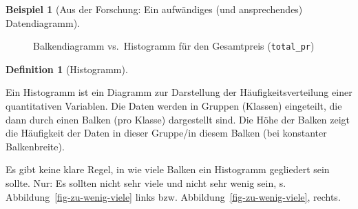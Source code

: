 \documentclass[
  a4paper,
]{scrbook}
\theoremstyle{definition}
\newtheorem{example}{Beispiel}[chapter]
\theoremstyle{definition}
\newtheorem{definition}{Definition}[chapter]
\theoremstyle{definition}
\theoremstyle{remark}
\begin{document}
\begin{example}[Aus der Forschung: Ein aufwändiges (und ansprechendes)
Datendiagramm]
\begin{figure}
\begin{minipage}{0.50\linewidth}
{}


\end{minipage}%

\caption{\label{fig-balken-hist}Balkendiagramm vs.~Histogramm für den
Gesamtpreis (\texttt{total\_pr})}

\end{figure}%

\begin{definition}[Histogramm]\protect\hypertarget{def-histogramm}{}\label{def-histogramm}

Ein Histogramm ist ein Diagramm zur Darstellung der
Häufigkeitsverteilung einer quantitativen Variablen. Die Daten werden in
Gruppen (Klassen) eingeteilt, die dann durch einen Balken (pro Klasse)
dargestellt sind. Die Höhe der Balken zeigt die Häufigkeit der Daten in
dieser Gruppe/in diesem Balken (bei konstanter Balkenbreite).

\end{definition}

Es gibt keine klare Regel, in wie viele Balken ein Histogramm gegliedert
sein sollte. Nur: Es sollten nicht sehr viele und nicht sehr wenig sein,
s. Abbildung~\ref{fig-zu-wenig-viele} links bzw.
Abbildung~\ref{fig-zu-wenig-viele}, rechts.

\begin{figure}

\begin{minipage}{0.50\linewidth}



\end{minipage}
\end{figure}
\end{example}
\end{document}
